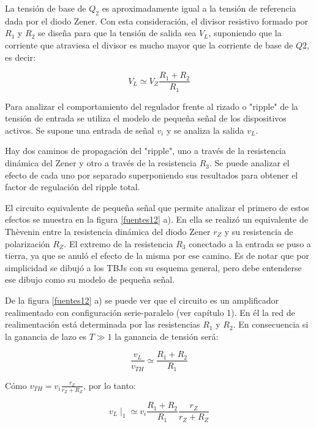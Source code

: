La tensión de base de $Q_2$ es aproximadamente igual a la tensión de
referencia dada por el diodo Zener. Con esta consideración, el
divisor resistivo formado por $R_1$ y $R_2$ se diseña para que la
tensión de salida sea $V_L$, suponiendo que la corriente que
atraviesa el divisor es mucho mayor que la corriente de base de
$Q2$, es decir:

\begin{equation}
	V_L\simeq V_Z \frac{\displaystyle R_1+R_2}{\displaystyle R_1}
\end{equation}

Para analizar el comportamiento del regulador frente al rizado o
"ripple" de la tensión de entrada se utiliza el modelo de pequeña
señal de los dispositivos activos. Se supone una entrada de señal
$v_i$ y se analiza la salida $v_L$.

Hay dos caminos de propagación del "ripple", uno a través de la
resistencia dinámica del Zener y otro a través de la resistencia
$R_3$. Se puede analizar el efecto de cada uno por separado
superponiendo sus resultados para obtener el factor de regulación
del ripple total.

El circuito equivalente de pequeña señal que permite analizar el
primero de estos efectos se muestra en la figura \ref{fuentes12} a).
En ella se realizó un equivalente de Thèvenin entre la resistencia
dinámica del diodo Zener $r_Z$ y su resistencia de polarización
$R_Z$. El extremo de la resistencia $R_3$ conectado a la entrada se
puso a tierra, ya que se anuló el efecto de la misma por ese camino.
Es de notar que por simplicidad se dibujó a los TBJs con su esquema
general, pero debe entenderse ese dibujo como su modelo de pequeña
señal.

De la figura \ref{fuentes12} a) se puede ver que el circuito es un
amplificador realimentado con configuración serie-paralelo (ver
capítulo 1). En él la red de realimentación está determinada por las
resistencias $R_1$ y $R_2$. En consecuencia si la ganancia de lazo
es $T\gg 1$ la ganancia de tensión será:


\begin{equation}
	\frac{\displaystyle v_L}{\displaystyle v_{TH}}\simeq \frac{\displaystyle R_1+R_2}{\displaystyle R_1}
\end{equation}

Cómo $v_{TH}=v_i\frac{\displaystyle r_Z}{\displaystyle r_Z+R_Z}$,
por lo tanto:

\begin{equation} \label{ecuacion1}
	v_L\mid_1 \simeq v_i \frac{\displaystyle R_1+R_2}{\displaystyle R_1} \frac{\displaystyle r_Z}{\displaystyle r_Z+R_Z}
\end{equation}


